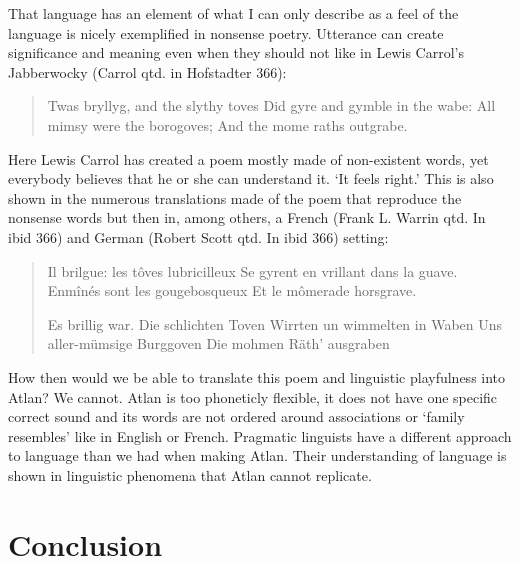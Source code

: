 That language has an element of what I can only describe as a feel of the language is nicely exemplified in nonsense poetry. Utterance can create significance and meaning even when they should not like in Lewis Carrol’s Jabberwocky (Carrol qtd. in Hofstadter 366):

\begin{quote}
Twas bryllyg, and the slythy toves 
 Did gyre and gymble in the wabe: 
 All mimsy were the borogoves; 
 And the mome raths outgrabe.  
\end{quote}

\noindent Here Lewis Carrol has created a poem mostly made of non-existent words, yet everybody believes that he or she can understand it. ‘It feels right.’ This is also shown in the numerous translations made of the poem that reproduce the nonsense words but then in, among others, a French (Frank L. Warrin qtd. In ibid 366) and German (Robert Scott qtd. In ibid 366) setting: 

\begin{quote}
Il brilgue: les t\^{o}ves lubricilleux 
Se gyrent en vrillant dans la guave. 
Enm\^{i}n\'{e}s sont les gougebosqueux 
Et le m\^{o}merade horsgrave.  

Es brillig war. Die schlichten Toven 
Wirrten un wimmelten in Waben 
Uns aller-m\"{u}msige Burggoven 
Die mohmen R\"{a}th’ ausgraben 
\end{quote}

\noindent How then would we be able to translate this poem and linguistic playfulness into Atlan? We cannot. Atlan is too phoneticly flexible, it does not have one specific correct sound and its words are not ordered around associations or ‘family resembles’ like in English or French. Pragmatic linguists have a different approach to language than we had when making Atlan. Their understanding of language is shown in linguistic phenomena that Atlan cannot replicate.   

\section{Conclusion}

